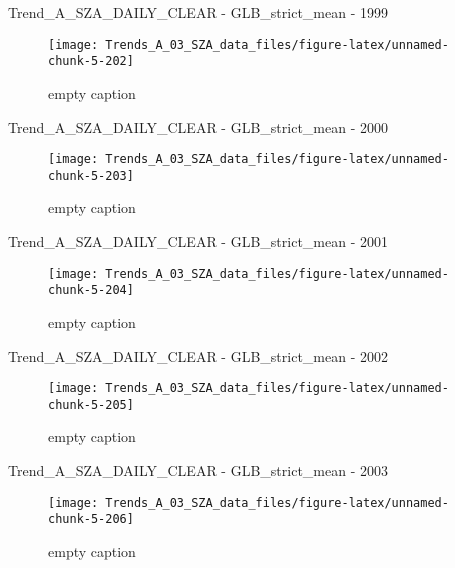 \documentclass[
  10pt,
  a4paper,oneside]{article}
\begin{document}
Trend\_A\_SZA\_DAILY\_CLEAR - GLB\_strict\_mean - 1999

\begin{figure}[!ht]

{\centering \texttt{[image: Trends\_A\_03\_SZA\_data\_files/figure-latex/unnamed-chunk-5-202]} 

}

\caption{ empty caption }\label{fig:unnamed-chunk-5-202}
\end{figure}

Trend\_A\_SZA\_DAILY\_CLEAR - GLB\_strict\_mean - 2000

\begin{figure}[!ht]

{\centering \texttt{[image: Trends\_A\_03\_SZA\_data\_files/figure-latex/unnamed-chunk-5-203]} 

}

\caption{ empty caption }\label{fig:unnamed-chunk-5-203}
\end{figure}

Trend\_A\_SZA\_DAILY\_CLEAR - GLB\_strict\_mean - 2001

\begin{figure}[!ht]

{\centering \texttt{[image: Trends\_A\_03\_SZA\_data\_files/figure-latex/unnamed-chunk-5-204]} 

}

\caption{ empty caption }\label{fig:unnamed-chunk-5-204}
\end{figure}

Trend\_A\_SZA\_DAILY\_CLEAR - GLB\_strict\_mean - 2002

\begin{figure}[!ht]

{\centering \texttt{[image: Trends\_A\_03\_SZA\_data\_files/figure-latex/unnamed-chunk-5-205]} 

}

\caption{ empty caption }\label{fig:unnamed-chunk-5-205}
\end{figure}

Trend\_A\_SZA\_DAILY\_CLEAR - GLB\_strict\_mean - 2003

\begin{figure}[!ht]

{\centering \texttt{[image: Trends\_A\_03\_SZA\_data\_files/figure-latex/unnamed-chunk-5-206]} 

}

\caption{ empty caption }\label{fig:unnamed-chunk-5-206}
\end{figure}
\end{document}
